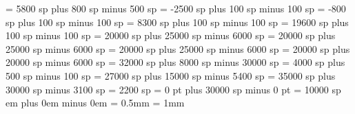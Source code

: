 \grebeforepunctainclinatashift= 5800 sp plus 800 sp minus 500 sp
\grepunctuminclinatumanddebilisshift= -2500 sp plus 100 sp minus 100 sp
\grepunctuminclinatumdebilisshift= -800 sp plus 100 sp minus 100 sp
\grepunctuminclinatumbigshift= 8300 sp plus 100 sp minus 100 sp
\grepunctuminclinatummaxshift= 19600 sp plus 100 sp minus 100 sp
\grespacearoundsmallbar = 20000 sp plus 25000 sp minus 6000 sp
\grespacearoundminor = 20000 sp plus 25000 sp minus 6000 sp
\grespacearoundmaior = 20000 sp plus 25000 sp minus 6000 sp
\grespacearoundfinalis = 20000 sp plus 20000 sp minus 6000 sp
\grespacebeforefinalfinalis= 32000 sp plus 8000 sp minus 30000 sp
\grespacearoundclefbars= 4000 sp plus 500 sp minus 100 sp
\gretextbartextspace = 27000 sp plus 15000 sp minus 5400 sp
\grenotebarspace = 35000 sp plus 30000 sp minus 3100 sp
\gremaximumspacewithoutdash = 2200 sp
\greafterclefnospace = 0 pt plus 30000 sp minus 0 pt
\greadditionallineswidth = 10000 sp
 em plus 0em minus 0em
\greminimalspaceatlinebeginning=1mm
\gremanualinitialwidth=0pt
\greaboveinitialseparation = 0.5mm
\grenoclefspace = 1mm

